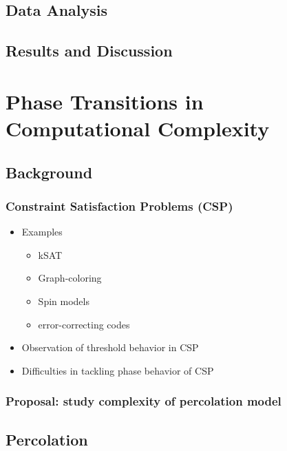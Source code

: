 \documentclass[11pt]{article}
\begin{document}
\subsection{Data Analysis}
\label{sec-5-3}
\subsection{Results and Discussion}
\label{sec-5-4}
\section{Phase Transitions in Computational Complexity}
\label{sec-6}
\subsection{Background}
\label{sec-6-1}
\subsubsection{Constraint Satisfaction Problems (CSP)}
\label{sec-6-1-1}
\begin{itemize}

\item Examples
\label{sec-6-1-1-1}%
\begin{itemize}

\item kSAT\\
\label{sec-6-1-1-1-1}%
\item Graph-coloring\\
\label{sec-6-1-1-1-2}%
\item Spin models\\
\label{sec-6-1-1-1-3}%
\item error-correcting codes\\
\label{sec-6-1-1-1-4}%
\end{itemize} %

\item Observation of threshold behavior in CSP\\
\label{sec-6-1-1-2}%
\item Difficulties in tackling phase behavior of CSP\\
\label{sec-6-1-1-3}%
\end{itemize} %
\subsubsection{Proposal: study complexity of percolation model}
\label{sec-6-1-2}
\subsection{Percolation}
\label{sec-6-2}
\end{document}
